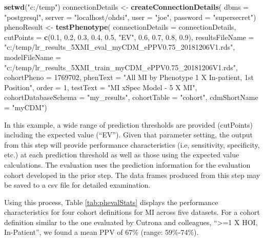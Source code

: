 \documentclass[11pt]{book}
\newenvironment{Shaded}{\begin{snugshade}}{\end{snugshade}}
\newcommand{\KeywordTok}[1]{\textcolor[rgb]{0.13,0.29,0.53}{\textbf{#1}}}
\newcommand{\DataTypeTok}[1]{\textcolor[rgb]{0.13,0.29,0.53}{#1}}
\newcommand{\DecValTok}[1]{\textcolor[rgb]{0.00,0.00,0.81}{#1}}
\newcommand{\FloatTok}[1]{\textcolor[rgb]{0.00,0.00,0.81}{#1}}
\newcommand{\StringTok}[1]{\textcolor[rgb]{0.31,0.60,0.02}{#1}}
\newcommand{\NormalTok}[1]{#1}
\theoremstyle{definition}
\theoremstyle{definition}
\theoremstyle{definition}
\theoremstyle{remark}
\begin{document}
\begin{Shaded}
\begin{Highlighting}[]
\KeywordTok{setwd}\NormalTok{(}\StringTok{"c:/temp"}\NormalTok{)}
\NormalTok{connectionDetails <-}\StringTok{ }\KeywordTok{createConnectionDetails}\NormalTok{(}
  \DataTypeTok{dbms =} \StringTok{"postgresql"}\NormalTok{,}
  \DataTypeTok{server =} \StringTok{"localhost/ohdsi"}\NormalTok{,}
  \DataTypeTok{user =} \StringTok{"joe"}\NormalTok{,}
  \DataTypeTok{password =} \StringTok{"supersecret"}\NormalTok{)}
\NormalTok{phenoResult <-}\StringTok{ }\KeywordTok{testPhenotype}\NormalTok{(}
  \DataTypeTok{connectionDetails =}\NormalTok{ connectionDetails,}
  \DataTypeTok{cutPoints =} \KeywordTok{c}\NormalTok{(}\FloatTok{0.1}\NormalTok{, }\FloatTok{0.2}\NormalTok{, }\FloatTok{0.3}\NormalTok{, }\FloatTok{0.4}\NormalTok{, }\FloatTok{0.5}\NormalTok{, }\StringTok{"EV"}\NormalTok{, }\FloatTok{0.6}\NormalTok{, }\FloatTok{0.7}\NormalTok{, }\FloatTok{0.8}\NormalTok{, }\FloatTok{0.9}\NormalTok{),}
  \DataTypeTok{resultsFileName =}
    \StringTok{"c:/temp/lr_results_5XMI_eval_myCDM_ePPV0.75_20181206V1.rds"}\NormalTok{,}
  \DataTypeTok{modelFileName =}
    \StringTok{"c:/temp/lr_results_5XMI_train_myCDM_ePPV0.75_20181206V1.rds"}\NormalTok{,}
  \DataTypeTok{cohortPheno =} \DecValTok{1769702}\NormalTok{,}
  \DataTypeTok{phenText =} \StringTok{"All MI by Phenotype 1 X In-patient, 1st Position"}\NormalTok{,}
  \DataTypeTok{order =} \DecValTok{1}\NormalTok{,}
  \DataTypeTok{testText =} \StringTok{"MI xSpec Model - 5 X MI"}\NormalTok{,}
  \DataTypeTok{cohortDatabaseSchema =} \StringTok{"my_results"}\NormalTok{,}
  \DataTypeTok{cohortTable =} \StringTok{"cohort"}\NormalTok{,}
  \DataTypeTok{cdmShortName =} \StringTok{"myCDM"}\NormalTok{)}
\end{Highlighting}
\end{Shaded}

In this example, a wide range of prediction thresholds are provided
(cutPoints) including the expected value (``EV''). Given that parameter
setting, the output from this step will provide performance
characteristics (i.e, sensitivity, specificity, etc.) at each prediction
threshold as well as those using the expected value calculations. The
evaluation uses the prediction information for the evaluation cohort
developed in the prior step. The data frames produced from this step may
be saved to a csv file for detailed examination.

Using this process, Table \ref{tab:phevalStats} displays the performance
characteristics for four cohort definitions for MI across five datasets.
For a cohort definition similar to the one evaluated by Cutrona and
colleagues, ``\textgreater{}=1 X HOI, In-Patient'', we found a mean PPV
of 67\% (range: 59\%-74\%).
\end{document}
